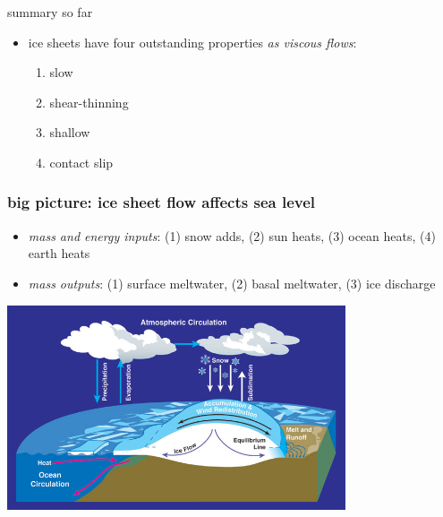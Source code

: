 \documentclass{beamer}
\begin{document}
\begin{frame}{summary so far}

\begin{itemize}
\item ice sheets have four outstanding properties \emph{as viscous flows}:
  \begin{enumerate}
  \item \alert{slow}
  \item \alert{shear-thinning}
  \item \alert{shallow}
  \item \alert{contact slip}
  \end{enumerate}
\end{itemize}
\end{frame}


\begin{frame}
  \frametitle{big picture: ice sheet flow affects sea level}

\medskip
\small
\begin{itemize}
\item \emph{mass and energy inputs}: (1) snow adds, (2) sun heats, (3) ocean heats, (4) earth heats
\item \emph{mass outputs}: (1) surface meltwater, (2) basal meltwater, (3) ice discharge
\end{itemize}

\begin{center}
  \includegraphics[width=0.75\textwidth]{mass-bal-atmos}

\end{center}
\end{frame}
\end{document}
